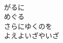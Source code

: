 \documentclass[10pt,b5j]{tarticle} %
\begin{document}
\begin{enumerate}
\begin{minipage}[c]{\blocksize}
        \vspace{\linespace}
        \item~\\
        がるに\\
        めぐる\\
        さらにゆくのを\\
        よえよいざやいざ
    
    \end{minipage}
\end{enumerate} %
\end{document}
